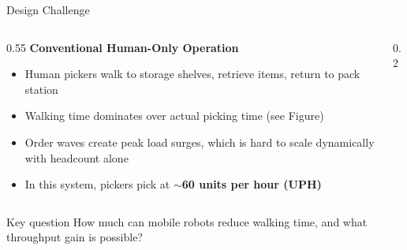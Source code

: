 \documentclass[aspectratio=169, 12pt]{beamer}
\begin{document}
\begin{frame}[shrink]{Design Challenge}
    \vspace{0.5cm}
  \begin{columns}[c]
    \begin{column}{0.55\textwidth}
      \small
      \textbf{Conventional Human-Only Operation}
      \vspace{0.3em}
      \begin{itemize}\setlength{\itemsep}{0.3em}
        \item Human pickers walk to storage shelves, retrieve items, return to pack station
        \item \alert{Walking time} dominates over actual picking time (see Figure)
        \item Order waves create \alert{peak load surges}, which is hard to scale dynamically with headcount alone
        \item In this system, pickers pick at \textbf{$\sim$60 units per hour (UPH)}
      \end{itemize}
    \end{column}

    \hfill
    
    \begin{column}{0.2\textwidth}
      \hfill
    \end{column}
  \end{columns}
  
  \vspace{1em}
  \begin{alertblock}{Key question}
  \vspace{0.5em}
    How much can mobile robots reduce walking time, and what throughput gain is possible?
  \end{alertblock}
\end{frame}
\end{document}
